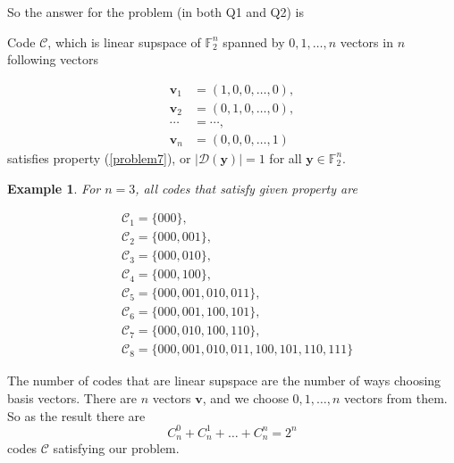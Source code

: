 \documentclass{article}
\newcommand{\FF}{\mathbb{F}}
\newtheorem{example}{Example}
\begin{document}
So the answer for the problem (in both Q1 and Q2) is

\begin{conclusion}
    Code $\mathcal{C}$, which is linear supspace of $\FF_2^n$ spanned by $0, 1, \ldots, n$ vectors in $n$ following vectors

    \begin{align*}
        \bm{v}_1 & = (1, 0, 0, \ldots, 0), \\
        \bm{v}_2 & = (0, 1, 0, \ldots, 0), \\
        \cdots & = \cdots, \\
        \bm{v}_n & = (0, 0, 0, \ldots, 1)
    \end{align*}
    satisfies property (\ref{problem7}), or $\lvert \mathcal{D}(\bm{y}) \rvert = 1$ for all $\bm{y} \in \FF_2^n$.
\end{conclusion}

\begin{example}
    For $n=3$, all codes that satisfy given property are

    \begin{align*}
        & \mathcal{C}_1 = \{ 000 \}, \\
        & \mathcal{C}_2 = \{ 000, 001 \}, \\
        & \mathcal{C}_3 = \{ 000, 010 \}, \\
        & \mathcal{C}_4 = \{ 000, 100 \}, \\
        & \mathcal{C}_5 = \{ 000, 001, 010, 011 \}, \\
        & \mathcal{C}_6 = \{ 000, 001, 100, 101 \}, \\
        & \mathcal{C}_7 = \{ 000, 010, 100, 110 \}, \\
        & \mathcal{C}_8 = \{ 000, 001, 010, 011, 100, 101, 110, 111 \}
    \end{align*}
\end{example}

\begin{remark}
    The number of codes that are linear supspace are the number of ways choosing basis vectors. There are $n$ vectors $\bm{v}$, and  we choose $0, 1, \ldots, n$ vectors from them. So as the result there are \[ C_n^0 + C_n^1 + \ldots + C_n^n = 2^n \] codes $\mathcal{C}$ satisfying our problem.
\end{remark}
\end{document}
